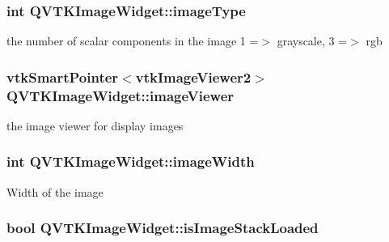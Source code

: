 \hypertarget{class_q_v_t_k_image_widget_a132867322988e692c324f5cc66697341}{
\subsubsection[{image\-Type}]{\setlength{\rightskip}{0pt plus 5cm}int {\bf Q\-V\-T\-K\-Image\-Widget\-::image\-Type}}}\label{d8/dd7/class_q_v_t_k_image_widget_a132867322988e692c324f5cc66697341}
the number of scalar components in the image 1 =$>$ grayscale, 3 =$>$ rgb \hypertarget{class_q_v_t_k_image_widget_aea73088ee5e4070c846427b8756cbfff}{
\subsubsection[{image\-Viewer}]{\setlength{\rightskip}{0pt plus 5cm}vtk\-Smart\-Pointer$<$vtk\-Image\-Viewer2$>$ {\bf Q\-V\-T\-K\-Image\-Widget\-::image\-Viewer}}}\label{d8/dd7/class_q_v_t_k_image_widget_aea73088ee5e4070c846427b8756cbfff}
the image viewer for display images \hypertarget{class_q_v_t_k_image_widget_a1ab611f7637a7885347b07ba9aa42e22}{
\subsubsection[{image\-Width}]{\setlength{\rightskip}{0pt plus 5cm}int {\bf Q\-V\-T\-K\-Image\-Widget\-::image\-Width}}}\label{d8/dd7/class_q_v_t_k_image_widget_a1ab611f7637a7885347b07ba9aa42e22}
Width of the image \hypertarget{class_q_v_t_k_image_widget_ac1af73fa525569f5ec5d581561b379a3}{
\subsubsection[{is\-Image\-Stack\-Loaded}]{\setlength{\rightskip}{0pt plus 5cm}bool {\bf Q\-V\-T\-K\-Image\-Widget\-::is\-Image\-Stack\-Loaded}}}\label{d8/dd7/class_q_v_t_k_image_widget_ac1af73fa525569f5ec5d581561b379a3}


